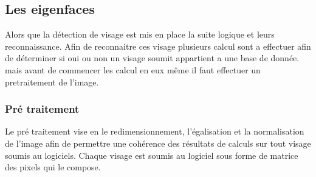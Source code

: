 \documentclass[12pt,a4paper]{article}
\begin{document}
\subsection{Les eigenfaces}

	Alors que la détection de visage est mis en place la suite logique et leurs reconnaissance. Afin de reconnaitre ces visage plusieurs calcul sont a effectuer afin de déterminer si oui ou non un visage soumit appartient a une base de donnée. mais avant de commencer les calcul en eux même il faut effectuer un pretraitement de l'image.

\subsubsection{Pré traitement}
	
	Le pré traitement vise en le redimensionnement, l'égalisation et la normalisation de l'image afin de permettre une cohérence des résultats de calculs sur tout visage soumis au logiciels. Chaque visage est soumis au logiciel sous forme de matrice des pixels qui le compose.\\
\end{document}
